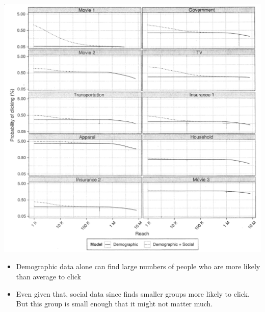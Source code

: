 \documentclass[aspectratio=169]{beamer}
\begin{document}
\begin{frame}

\begin{center}
\includegraphics[height=0.6\textheight]{figures/goel_predicting_2014_fig2}
\end{center}

\vfill

\begin{itemize}
\item Demographic data alone can find large numbers of people who are more likely than average to click \pause
\item Even given that, social data since finds smaller groups more likely to click. But this group is small enough that it might not matter much.
\end{itemize}

\end{frame}
\end{document}
